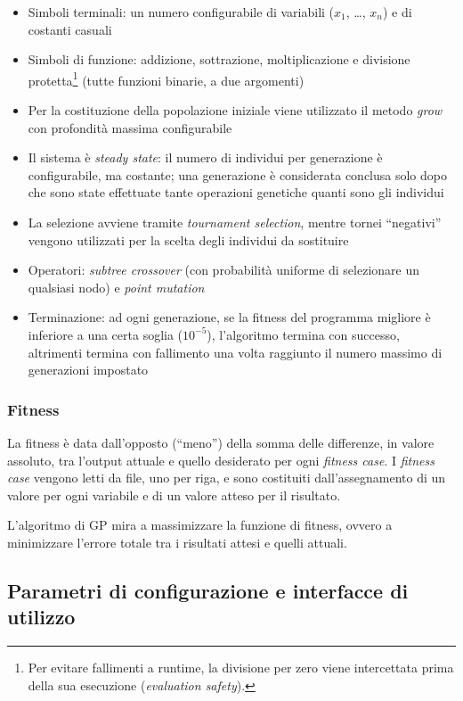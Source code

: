\documentclass{../llncs}
\newcommand{\labelssec}[1]{\label{ssec:#1}}
\begin{document}
\begin{itemize}
\item Simboli terminali: un numero configurabile di variabili ($x_1$, \ldots, $x_n$) e di costanti casuali
\item Simboli di funzione: addizione, sottrazione, moltiplicazione e divisione protetta\footnote{Per evitare fallimenti a runtime, la divisione per zero viene intercettata prima della sua esecuzione (\emph{evaluation safety}).} (tutte funzioni binarie, a due argomenti)
\item Per la costituzione della popolazione iniziale viene utilizzato il metodo \emph{grow} con profondità massima configurabile
\item Il sistema è \emph{steady state}: il numero di individui per generazione è configurabile, ma costante; una generazione è considerata conclusa solo dopo che sono state effettuate tante operazioni genetiche quanti sono gli individui
\item La selezione avviene tramite \emph{tournament selection}, mentre tornei ``negativi'' vengono utilizzati per la scelta degli individui da sostituire
\item Operatori: \emph{subtree crossover} (con probabilità uniforme di selezionare un qualsiasi nodo) e \emph{point mutation}
\item Terminazione: ad ogni generazione, se la fitness del programma migliore è inferiore a una certa soglia ($10^{-5}$), l'algoritmo termina con successo, altrimenti termina con fallimento una volta raggiunto il numero massimo di generazioni impostato
\end{itemize}

\subsubsection{Fitness}
La fitness è data dall'opposto (``meno'') della somma delle differenze, in valore assoluto, tra l'output attuale e quello desiderato per ogni \emph{fitness case}.
I \emph{fitness case} vengono letti da file, uno per riga, e sono costituiti dall'assegnamento di un valore per ogni variabile e di un valore atteso per il risultato.

L'algoritmo di GP mira a massimizzare la funzione di fitness, ovvero a minimizzare l'errore totale tra i risultati attesi e quelli attuali.

\subsection{Parametri di configurazione e interfacce di utilizzo}
\labelssec{TinyGP_parameters}
\end{document}

